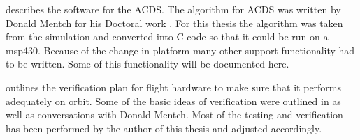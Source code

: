  describes the software for the \ac{ACDS}. The algorithm for \ac{ACDS} was written by Donald Mentch for his Doctoral work \cite{Mentch11}. For this thesis the algorithm was taken from the \matlab simulation and converted into C code so that it could be run on a msp430. Because of the change in platform many other support functionality had to be written. Some of this functionality will be documented here.

 outlines the verification plan for flight hardware to make sure that it performs adequately on orbit. Some of the basic ideas of verification were outlined in \cite{Mentch11} as well as conversations with Donald Mentch. Most of the testing and verification has been performed by the author of this thesis and adjusted accordingly.

